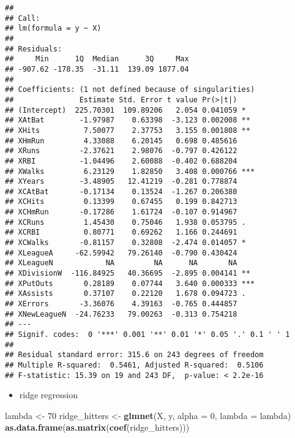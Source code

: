 \documentclass[
]{article}
\newenvironment{Shaded}{\begin{snugshade}}{\end{snugshade}}
\newcommand{\AttributeTok}[1]{\textcolor[rgb]{0.13,0.29,0.53}{#1}}
\newcommand{\DecValTok}[1]{\textcolor[rgb]{0.00,0.00,0.81}{#1}}
\newcommand{\FunctionTok}[1]{\textcolor[rgb]{0.13,0.29,0.53}{\textbf{#1}}}
\newcommand{\NormalTok}[1]{#1}
\newcommand{\OtherTok}[1]{\textcolor[rgb]{0.56,0.35,0.01}{#1}}
\providecommand{\tightlist}{%
  \setlength{\itemsep}{0pt}\setlength{\parskip}{0pt}}
\begin{document}
\begin{verbatim}
## 
## Call:
## lm(formula = y ~ X)
## 
## Residuals:
##     Min      1Q  Median      3Q     Max 
## -907.62 -178.35  -31.11  139.09 1877.04 
## 
## Coefficients: (1 not defined because of singularities)
##               Estimate Std. Error t value Pr(>|t|)    
## (Intercept)  225.70301  109.89206   2.054 0.041059 *  
## XAtBat        -1.97987    0.63398  -3.123 0.002008 ** 
## XHits          7.50077    2.37753   3.155 0.001808 ** 
## XHmRun         4.33088    6.20145   0.698 0.485616    
## XRuns         -2.37621    2.98076  -0.797 0.426122    
## XRBI          -1.04496    2.60088  -0.402 0.688204    
## XWalks         6.23129    1.82850   3.408 0.000766 ***
## XYears        -3.48905   12.41219  -0.281 0.778874    
## XCAtBat       -0.17134    0.13524  -1.267 0.206380    
## XCHits         0.13399    0.67455   0.199 0.842713    
## XCHmRun       -0.17286    1.61724  -0.107 0.914967    
## XCRuns         1.45430    0.75046   1.938 0.053795 .  
## XCRBI          0.80771    0.69262   1.166 0.244691    
## XCWalks       -0.81157    0.32808  -2.474 0.014057 *  
## XLeagueA     -62.59942   79.26140  -0.790 0.430424    
## XLeagueN            NA         NA      NA       NA    
## XDivisionW  -116.84925   40.36695  -2.895 0.004141 ** 
## XPutOuts       0.28189    0.07744   3.640 0.000333 ***
## XAssists       0.37107    0.22120   1.678 0.094723 .  
## XErrors       -3.36076    4.39163  -0.765 0.444857    
## XNewLeagueN  -24.76233   79.00263  -0.313 0.754218    
## ---
## Signif. codes:  0 '***' 0.001 '**' 0.01 '*' 0.05 '.' 0.1 ' ' 1
## 
## Residual standard error: 315.6 on 243 degrees of freedom
## Multiple R-squared:  0.5461, Adjusted R-squared:  0.5106 
## F-statistic: 15.39 on 19 and 243 DF,  p-value: < 2.2e-16
\end{verbatim}

\begin{itemize}
\tightlist
\item
  ridge regression
\end{itemize}

\begin{Shaded}
\begin{Highlighting}[]
\NormalTok{lambda }\OtherTok{\textless{}{-}} \DecValTok{70}
\NormalTok{ridge\_hitters }\OtherTok{\textless{}{-}} \FunctionTok{glmnet}\NormalTok{(X, y, }\AttributeTok{alpha =} \DecValTok{0}\NormalTok{, }\AttributeTok{lambda =}\NormalTok{ lambda)}
\FunctionTok{as.data.frame}\NormalTok{(}\FunctionTok{as.matrix}\NormalTok{(}\FunctionTok{coef}\NormalTok{(ridge\_hitters)))}
\end{Highlighting}
\end{Shaded}
\end{document}
